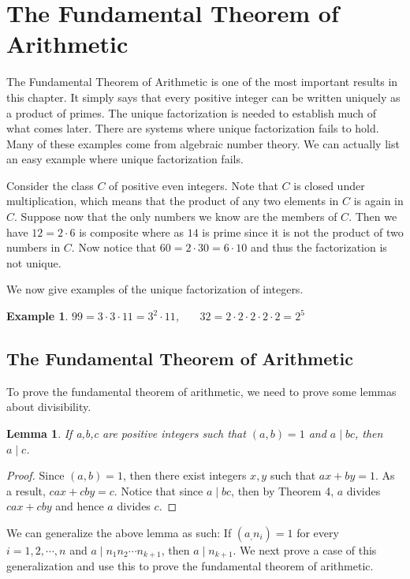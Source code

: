 \documentclass[12pt,letterpaper]{book}
\newtheorem{lemma}{Lemma}
\newtheorem{example}{Example}
\begin{document}
\section{The Fundamental Theorem of Arithmetic}
The Fundamental Theorem of Arithmetic is one of the most important
results in this chapter. It simply says that every positive integer
can be written uniquely as a product of primes.  The unique
factorization is needed to establish much of what comes later. There
are systems where unique factorization fails to hold.  Many of these
examples come from algebraic number theory.  We can actually list an
easy example where unique factorization fails.
\par Consider the class $C$ of positive even integers.  Note that $C$ is closed under multiplication,
which means that the product of any two elements in $C$ is again in $C$.
Suppose now that the only numbers we know are the members of $C$.
Then we have $12=2\cdot 6$ is composite where as $14$ is prime since it is not the product of two numbers in $C$.
Now notice that $60=2\cdot 30=6\cdot 10$ and thus the factorization is not unique.
\par We now give examples of the unique factorization of integers.
\begin{example}
$99=3\cdot 3\cdot 11=3^2\cdot 11$, \ \ \ $32=2\cdot 2\cdot 2\cdot 2\cdot 2=2^5$
\end{example}

\subsection{The Fundamental Theorem of Arithmetic}
To prove the fundamental theorem of arithmetic, we need to prove
some lemmas about divisibility.

\begin{lemma}\label{lemma4}
If a,b,c are positive integers such that $(a,b)=1$ and $a \mid bc$,
then $a\mid c$.
\end{lemma}

\begin{proof}
Since $(a,b)=1$, then there exist integers $x,y$ such that
$ax+by=1$. As a result, $cax+cby=c$.  Notice that since $a \mid bc$,
then by Theorem 4,  $a$ divides $cax+cby$ and hence $a$ divides $c$.
\end{proof}

We can generalize the above lemma as such: If $(a_,n_i)=1$ for every\\
$i=1,2,\cdots,n$ and $a\mid n_1n_2\cdots n_{k+1}$, then $a\mid
n_{k+1}$. We next prove a case of this generalization and use this
to prove the fundamental theorem of arithmetic.
\end{document}
